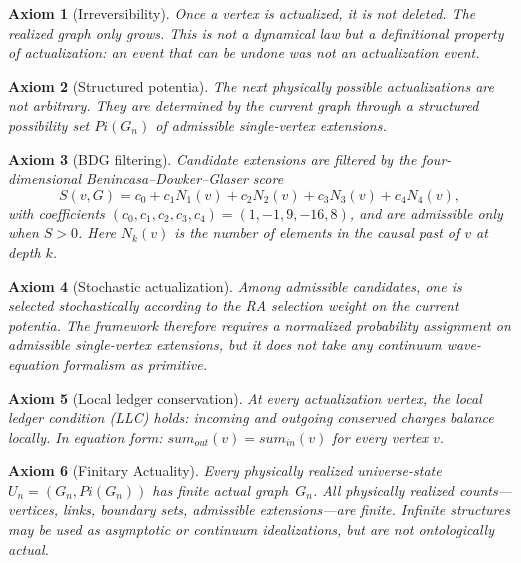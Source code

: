 \documentclass[11pt]{article}
\def\Pi{Pi}%
\def\mathrm#1{#1}%
\def\sum{sum}%
\newtheorem{axiom}{Axiom}
\newcommand{\Pot}{\Pi}
\begin{document}
\begin{axiom}[Irreversibility]
\label{ax:irrev}
Once a vertex is actualized, it is not deleted. The realized graph only grows. This is not a dynamical law but a definitional property of actualization: an event that can be undone was not an actualization event.
\end{axiom}

\begin{axiom}[Structured potentia]
\label{ax:potentia}
The next physically possible actualizations are not arbitrary. They are determined by the current graph through a structured possibility set $\Pot(G_n)$ of admissible single-vertex extensions.
\end{axiom}

\begin{axiom}[BDG filtering]
\label{ax:bdg}
Candidate extensions are filtered by the four-dimensional Benincasa--Dowker--Glaser score
\begin{equation}
\label{eq:bdg}
S(v,G)=c_0 + c_1 N_1(v)+c_2 N_2(v)+c_3 N_3(v)+c_4 N_4(v),
\end{equation}
with coefficients $(c_0,c_1,c_2,c_3,c_4)=(1,-1,9,-16,8)$, and are admissible only when $S>0$. Here $N_k(v)$ is the number of elements in the causal past of $v$ at depth $k$.
\end{axiom}

\begin{axiom}[Stochastic actualization]
\label{ax:stochastic}
Among admissible candidates, one is selected stochastically according to the RA selection weight on the current potentia. The framework therefore requires a normalized probability assignment on admissible single-vertex extensions, but it does not take any continuum wave-equation formalism as primitive.
\end{axiom}

\begin{axiom}[Local ledger conservation]
\label{ax:llc}
At every actualization vertex, the local ledger condition (LLC) holds: incoming and outgoing conserved charges balance locally. In equation form: $\sum_{\mathrm{out}}(v)=\sum_{\mathrm{in}}(v)$ for every vertex $v$.
\end{axiom}

\begin{axiom}[Finitary Actuality]
\label{ax:finite}
Every physically realized universe-state $U_n=(G_n,\Pot(G_n))$ has finite actual graph~$G_n$. All physically realized counts---vertices, links, boundary sets, admissible extensions---are finite. Infinite structures may be used as asymptotic or continuum idealizations, but are not ontologically actual.
\end{axiom}
\end{document}
